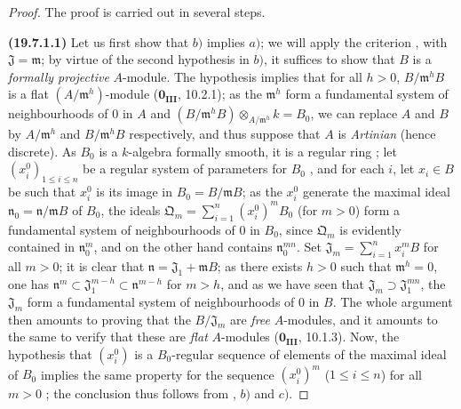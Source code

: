 \begin{proof}
The proof is carried out in several steps.

\medskip
\noindent{}\textbf{(19.7.1.1)}\enspace
Let us first show that $b)$ implies $a)$; we will apply the criterion , with $\mathfrak{J}=\mathfrak{m}$; by virtue of the second hypothesis in $b)$, it suffices to show that $B$ is a \emph{formally projective} $A$-module.
The hypothesis implies that for all $h>0$, $B/\mathfrak{m}^h B$ is a flat $(A/\mathfrak{m}^h)$-module ($\mathbf{0_{III}}$, 10.2.1); as the $\mathfrak{m}^h$ form a fundamental system of neighbourhoods of $0$ in $A$ and $(B/\mathfrak{m}^h B)\otimes_{A/\mathfrak{m}^h} k = B_0$, we can replace $A$ and $B$ by $A/\mathfrak{m}^h$ and $B/\mathfrak{m}^h B$ respectively, and thus suppose that $A$ is \emph{Artinian} (hence discrete).
As $B_0$ is a $k$-algebra formally smooth, it is a regular ring ; let $(x_i^0)_{1\leq i\leq n}$ be a regular system of parameters for $B_0$ ,
and for each $i$, let $x_i\in B$ be such that $x_i^0$ is its image in $B_0=B/\mathfrak{m}B$; as the $x_i^0$ generate the maximal ideal $\mathfrak{n}_0=\mathfrak{n}/\mathfrak{m}B$ of $B_0$, the ideals $\mathfrak{Q}_m=\sum_{i=1}^n (x_i^0)^m B_0$ (for $m>0$) form a fundamental system of neighbourhoods of $0$ in $B_0$, since $\mathfrak{Q}_m$ is evidently contained in $\mathfrak{n}_0^m$, and on the other hand contains $\mathfrak{n}_0^{mn}$.
Set $\mathfrak{J}_m=\sum_{i=1}^n x_i^m B$ for all $m>0$;
it is clear that $\mathfrak{n}=\mathfrak{J}_1+\mathfrak{m}B$; as there exists $h>0$ such that $\mathfrak{m}^h=0$, one has $\mathfrak{n}^m\subset\mathfrak{J}_1^{m-h}\subset\mathfrak{n}^{m-h}$ for $m>h$, and as we have seen that $\mathfrak{J}_m\supset\mathfrak{J}_1^{mn}$, the $\mathfrak{J}_m$ form a fundamental system of neighbourhoods of $0$ in $B$.
The whole argument then amounts to proving that the $B/\mathfrak{J}_m$ are \emph{free} $A$-modules, and it amounts to the same to verify that these are \emph{flat} $A$-modules ($\mathbf{0_{III}}$, 10.1.3).
Now, the hypothesis that $(x_i^0)$ is a $B_0$-regular sequence of elements of the maximal ideal of $B_0$ implies the same property for the sequence $(x_i^0)^m$ ($1\leq i\leq n$) for all $m>0$ ; the conclusion thus follows from , $b)$ and $c)$.
\end{proof}

